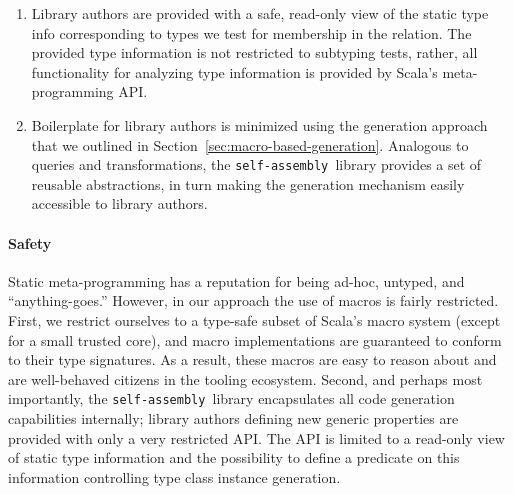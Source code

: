 \documentclass[preprint,nocopyrightspace]{sigplanconf}
\newcommand{\selfassembly}{\texttt{self-assembly~}}
\begin{document}
\begin{enumerate}
\item Library authors are provided with a safe, read-only view of the static
      type info corresponding to types we test for membership in the relation.
      The provided type information is not restricted to subtyping tests, rather,
      all functionality for analyzing type information is provided by Scala's
      meta-programming API.

\item Boilerplate for library authors is minimized using the generation approach
      that we outlined in Section~\ref{sec:macro-based-generation}. Analogous to
      queries and transformations, the \selfassembly library provides a set of
      reusable abstractions, in turn making the generation mechanism easily
      accessible to library authors.
\end{enumerate}

\paragraph{Safety}
Static meta-programming has a reputation for being ad-hoc, untyped, and
``anything-goes.'' However, in our approach the use of macros is fairly
restricted. First, we restrict ourselves to a type-safe subset of Scala's macro system
(except for a small trusted core), and macro
implementations are guaranteed to conform to their type signatures. As a result,
these macros are easy to reason about and are well-behaved citizens in the tooling
ecosystem. Second, and perhaps most importantly, the \selfassembly library
encapsulates all code generation capabilities internally; library authors
defining new generic properties are provided with only a very restricted API.
The API is limited to a read-only view of static type information and the
possibility to define a predicate on this information controlling type class
instance generation.




\end{document}
